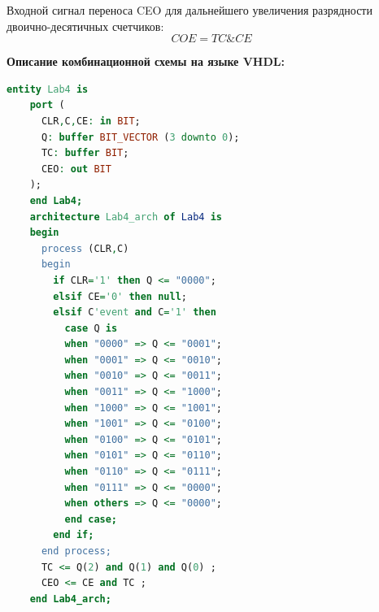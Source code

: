 \documentclass[a4paper,12pt]{article}
\begin{document}
Входной сигнал переноса CEO для дальнейшего увеличения разрядности двоично-десятичных счетчиков:
\[
	COE = TC \& CE
\]

\newpage
\textbf{Описание комбинационной схемы на языке VHDL:}
\begin{lstlisting}[frame=single, language=VHDL, breaklines=true, tabsize=6]  % Code
	entity Lab4 is
	port (
	  CLR,C,CE: in BIT;
	  Q: buffer BIT_VECTOR (3 downto 0);
	  TC: buffer BIT;
	  CEO: out BIT
	);
	end Lab4;
	architecture Lab4_arch of Lab4 is
	begin
	  process (CLR,C)
	  begin
	    if CLR='1' then Q <= "0000";
	    elsif CE='0' then null;
	    elsif C'event and C='1' then
	      case Q is
	      when "0000" => Q <= "0001";
	      when "0001" => Q <= "0010";
	      when "0010" => Q <= "0011";
	      when "0011" => Q <= "1000";
	      when "1000" => Q <= "1001";
	      when "1001" => Q <= "0100";
	      when "0100" => Q <= "0101";
	      when "0101" => Q <= "0110";
	      when "0110" => Q <= "0111";
	      when "0111" => Q <= "0000";
	      when others => Q <= "0000";
	      end case;
	    end if;
	  end process;
	  TC <= Q(2) and Q(1) and Q(0) ;
	  CEO <= CE and TC ;
	end Lab4_arch;
\end{lstlisting}
\end{document}

